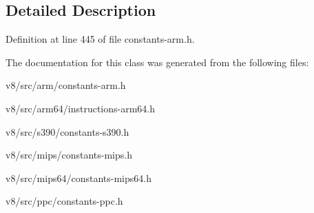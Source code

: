 \subsection{Detailed Description}


Definition at line 445 of file constants-\/arm.\+h.



The documentation for this class was generated from the following files\+:\begin{DoxyCompactItemize}
\item 
v8/src/arm/constants-\/arm.\+h\item 
v8/src/arm64/instructions-\/arm64.\+h\item 
v8/src/s390/constants-\/s390.\+h\item 
v8/src/mips/constants-\/mips.\+h\item 
v8/src/mips64/constants-\/mips64.\+h\item 
v8/src/ppc/constants-\/ppc.\+h\end{DoxyCompactItemize}

